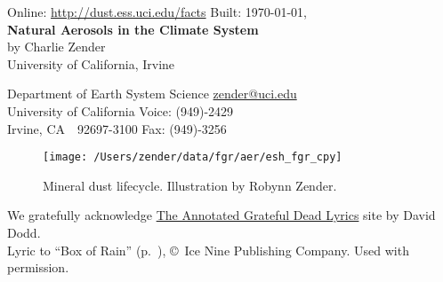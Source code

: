 \documentclass[12pt,twoside]{book}
\begin{document}

\ifpdf %
\fi %

\begin{center}
Online: \url{http://dust.ess.uci.edu/facts} \hfill Built: \shortdate\today, \xxivtime\\
\bigskip
{\Large \textbf{Natural Aerosols in the Climate System}}\\
\bigskip
by Charlie Zender\\
University of California, Irvine\\
\end{center}
Department of Earth System Science \hfill \url{zender@uci.edu}\\
University of California \hfill Voice: (949)-2429\\
Irvine, CA~~92697-3100 \hfill Fax: (949)-3256

\begin{figure*}[b]
\centering
\texttt{[image: /Users/zender/data/fgr/aer/esh\_fgr\_cpy]}\vfill
\caption[Mineral Dust Lifecycle]{
Mineral dust lifecycle. 
Illustration by Robynn Zender.
\label{fgr:esh}}
\end{figure*}

\frontmatter %
\setcounter{page}{1}
\pagestyle{headings}
\thispagestyle{empty}

\noindent We gratefully acknowledge \href{http://arts.ucsc.edu/gdead/agdl}{The Annotated Grateful Dead Lyrics} site by David Dodd.\\
\noindent Lyric to ``Box of Rain'' (p.~\pageref{BoR}), \copyright\ Ice Nine Publishing Company. Used with permission.\\

\tableofcontents
\listoffigures
\listoftables
\clearpage

\mainmatter %
\setcounter{page}{1}
\end{document}
